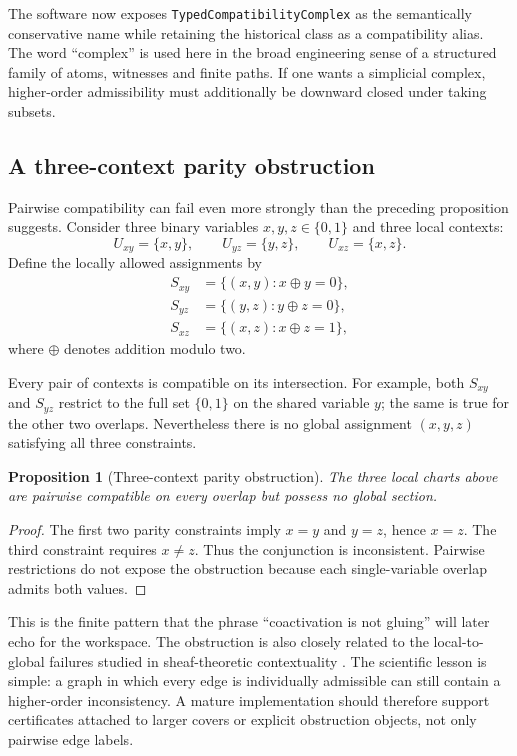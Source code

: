 \documentclass[11pt]{article}
\newcommand{\Bool}{\{0,1\}}
\newtheorem{proposition}{Proposition}
\begin{document}
The software now exposes \texttt{TypedCompatibilityComplex} as the semantically conservative name while retaining the historical class as a compatibility alias. The word ``complex'' is used here in the broad engineering sense of a structured family of atoms, witnesses and finite paths. If one wants a simplicial complex, higher-order admissibility must additionally be downward closed under taking subsets.

\subsection{A three-context parity obstruction}

Pairwise compatibility can fail even more strongly than the preceding proposition suggests. Consider three binary variables \(x,y,z\in\Bool\) and three local contexts:
\[
U_{xy}=\{x,y\},\qquad U_{yz}=\{y,z\},\qquad U_{xz}=\{x,z\}.
\]
Define the locally allowed assignments by
\[
\begin{aligned}
S_{xy}&=\{(x,y):x\oplus y=0\},\\
S_{yz}&=\{(y,z):y\oplus z=0\},\\
S_{xz}&=\{(x,z):x\oplus z=1\},
\end{aligned}
\]
where \(\oplus\) denotes addition modulo two.

Every pair of contexts is compatible on its intersection. For example, both \(S_{xy}\) and \(S_{yz}\) restrict to the full set \(\{0,1\}\) on the shared variable \(y\); the same is true for the other two overlaps. Nevertheless there is no global assignment \((x,y,z)\) satisfying all three constraints.

\begin{proposition}[Three-context parity obstruction]
The three local charts above are pairwise compatible on every overlap but possess no global section.
\end{proposition}

\begin{proof}
The first two parity constraints imply \(x=y\) and \(y=z\), hence \(x=z\). The third constraint requires \(x\ne z\). Thus the conjunction is inconsistent. Pairwise restrictions do not expose the obstruction because each single-variable overlap admits both values.
\end{proof}

This is the finite pattern that the phrase ``coactivation is not gluing'' will later echo for the workspace. The obstruction is also closely related to the local-to-global failures studied in sheaf-theoretic contextuality \cite{abramsky2011}. The scientific lesson is simple: a graph in which every edge is individually admissible can still contain a higher-order inconsistency. A mature implementation should therefore support certificates attached to larger covers or explicit obstruction objects, not only pairwise edge labels.
\end{document}
